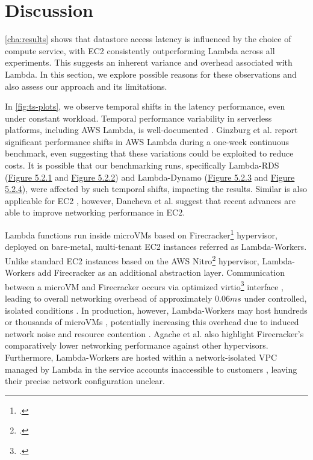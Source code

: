 \section{Discussion}
\label{cha:discuss}

\cref{cha:results} shows that datastore access latency is influenced by the choice of compute service, with EC2 consistently outperforming Lambda across all experiments. This suggests an inherent variance and overhead associated with Lambda. In this section, we explore possible reasons for these observations and also assess our approach and its limitations.

In \cref{fig:ts-plots}, we observe temporal shifts in the latency performance, even under constant workload. Temporal performance variability in serverless platforms, including AWS Lambda, is well-documented \cite{paper_ginzburg_lambda_var,article_eismann_lambda_var,paper_schirmer_night_shift}. Ginzburg et al. \cite{paper_ginzburg_lambda_var} report significant performance shifts in AWS Lambda during a one-week continuous benchmark, even suggesting that these variations could be exploited to reduce costs. It is possible that our benchmarking runs, specifically Lambda-RDS (\hyperref[fig:bar_rds_const]{Figure 5.2.1} and \hyperref[fig:bar_rds_bursty]{Figure 5.2.2}) and Lambda-Dynamo (\hyperref[fig:bar_ddb_const]{Figure 5.2.3} and \hyperref[fig:bar_ddb_bursty]{Figure 5.2.4}), were affected by such temporal shifts, impacting the results. Similar is also applicable for EC2 \cite{paper_iosup_performance,article_schad_cloud_var}, however, Dancheva et al. \cite{article_dancheva_ec2_var} suggest that recent advances are able to improve networking performance in EC2.

Lambda functions run inside microVMs based on Firecracker\footcite{https://firecracker-microvm.github.io/} hypervisor, deployed on bare-metal, multi-tenant EC2 instances referred as Lambda-Workers. Unlike standard EC2 instances based on the AWS Nitro\footcite{https://aws.amazon.com/ec2/nitro/} hypervisor, Lambda-Workers add Firecracker as an additional abstraction layer. Communication between a microVM and Firecracker occurs via optimized virtio\footcite{https://libvirt.org/} interface \cite{paper_brooker_lambda}, leading to overall networking overhead of approximately $0.06ms$ under controlled, isolated conditions \cite{repo_aws_firecracker}. In production, however, Lambda-Workers may host hundreds or thousands of microVMs \cite{paper_agache_firecracker}, potentially increasing this overhead due to induced network noise and resource contention \cite{article_desensi_noise,paper_wang_faas_bts}. Agache et al. \cite{paper_agache_firecracker} also highlight Firecracker's comparatively lower networking performance against other hypervisors. Furthermore, Lambda-Workers are hosted within a network-isolated VPC managed by Lambda in the service accounts inaccessible to customers \cite{web_aws_lambda_security}, leaving their precise network configuration unclear.

